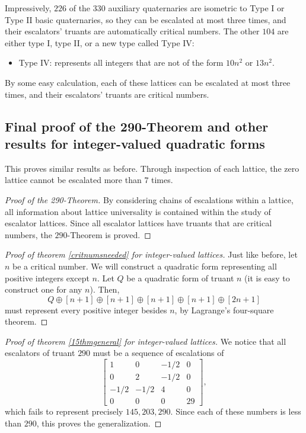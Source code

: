 \documentclass[letterpaper, 12pt]{article}
\begin{document}
Impressively, $226$ of the $330$ auxiliary quaternaries are isometric to Type I or Type II basic quaternaries, so they can be escalated at most three times, and their escalators' truants are automatically critical numbers. The other $104$ are either type I, type II, or a new type called Type IV:
\begin{itemize}
    \item Type IV: represents all integers that are not of the form $10n^2$ or $13n^2$.
\end{itemize}
By some easy calculation, each of these lattices can be escalated at most three times, and their escalators' truants are critical numbers.

\subsection{Final proof of the 290-Theorem and other results for integer-valued quadratic forms}
This proves similar results as before. Through inspection of each lattice, the zero lattice cannot be escalated more than $7$ times.

\begin{proof}[Proof of the 290-Theorem]
    By considering chains of escalations within a lattice, all information about lattice universality is contained within the study of escalator lattices. Since all escalator lattices have truants that are critical numbers, the $290$-Theorem is proved.
\end{proof}

\begin{proof}[Proof of theorem \ref{critnumsneeded} for integer-valued lattices]
    Just like before, let $n$ be a critical number. We will construct a quadratic form representing all positive integers except $n$. Let $Q$ be a quadratic form of truant $n$ (it is easy to construct one for any $n$). Then,
    \[Q \oplus [n + 1] \oplus [n + 1] \oplus [n + 1] \oplus [n + 1] \oplus [2n + 1]\]
    must represent every positive integer besides $n$, by Lagrange's four-square theorem.
\end{proof}

\begin{proof}[Proof of theorem \ref{15thmgeneral} for integer-valued lattices]
    We notice that all escalators of truant $290$ must be a sequence of escalations of
    \[\begin{bmatrix}
    1 & 0 & -1/2 & 0 \\
    0 & 2 & -1/2 & 0 \\
    -1/2 & -1/2 & 4 & 0 \\
    0 & 0 & 0 & 29
    \end{bmatrix},\]
    which fails to represent precisely $145, 203, 290$. Since each of these numbers is less than $290$, this proves the generalization.
\end{proof}
\end{document}
